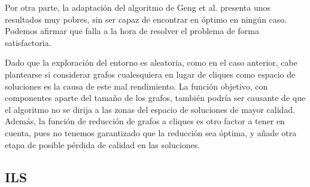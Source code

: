 Por otra parte, la adaptación del algoritmo de Geng et al. presenta unos resultados
muy pobres, sin ser capaz de encontrar en óptimo en ningún caso. Podemos afirmar que
falla a la hora de resolver el problema de forma satisfactoria.

Dado que la exploración del entorno es aleatoria, como en el caso anterior, cabe
plantearse si considerar grafos cualesquiera en lugar de cliques como espacio de
soluciones es la causa de este mal rendimiento. La función objetivo, con componentes
aparte del tamaño de los grafos, también podría ser causante de que el algoritmo
no se dirija a las zonas del espacio de soluciones de mayor calidad. Además, la
función de reducción de grafos a cliques es otro factor a tener en cuenta, pues
no tenemos garantizado que la reducción sea óptima, y añade otra etapa de  posible
pérdida de calidad en las soluciones.

\subsection{ILS}

